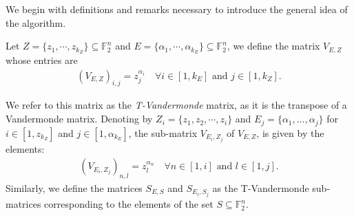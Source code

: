 \documentclass[11pt]{llncs}
\begin{document}
We begin with definitions and remarks necessary to introduce the general idea of the algorithm.




\begin{definition}\label{def:tVandermonde}
    Let $Z = \{z_1, \cdots, z_{k_Z}\} \subseteq \mathbb{F}_2^n$ and $E = \{\alpha_1, \cdots, \alpha_{k_E}\}\subseteq \mathbb{F}_2^n$, we define the matrix $V_{E,Z}$ whose entries are
    \begin{align*}
        \left(V_{E,Z}\right)_{i,j} = z_j^{\alpha_i} \quad \forall i\in[1,k_E] \mbox{ and } j\in[1, k_Z].
    \end{align*}
    
  We refer to this matrix as the \textit{T-Vandermonde} matrix, as it is the transpose of a Vandermonde matrix.
    Denoting by $Z_i = \{z_1, z_2, \cdots, z_i\}$ and $E_j = \{\alpha_1, \dots, \alpha_j\}$ for $i\in[1,z_{k_Z}]$ and $j\in[1,\alpha_{k_E}]$, the sub-matrix $V_{E_i, Z_j}$ of $V_{E,Z}$, is given by the elements:
    \begin{align*}
        \left(V_{E_i,Z_j}\right)_{n,l} = z_l^{\alpha_n} \quad \forall n\in[1,i] \mbox{ and } l\in[1, j].
    \end{align*}
    Similarly, we define the matrices $S_{E,S}$ and $S_{E_i, S_j}$ as the T-Vandermonde sub-matrices corresponding to the elements of the set $S\subseteq \mathbb{F}_2^n$.
\end{definition}
\end{document}
